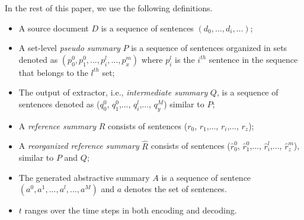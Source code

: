 In the rest of this paper, we use the following definitions.
\begin{itemize}
\item A source document $D$ is a sequence of sentences 
$(d_0, ...,d_i,...)$; 
\item A set-level \textit{pseudo summary} $P$ is
a sequence of sentences organized in sets 
denoted as $(p^0_0, p^0_1,...,p^l_i,...,p^m_x)$ 
where $p_i^l$ is the $i^{th}$ sentence in the sequence that
belongs to the $l^{th}$ set;
\item The output of extractor, i.e.,  \textit{intermediate summary}
$Q$, is a sequence of sentences denoted as 
($q^0_0$, $q^0_1$,..., $q^l_i$,..., $q^M_y$) similar to $P$;
\item A \textit{reference summary} $R$ consists of sentences 
($r_0$, $r_1$,..., $r_i$,..., $r_z$);
\item A \textit{reorganized reference summary} $\hat{R}$ consists of sentences 
($\hat{r}^0_0$, $\hat{r}^0_1$,..., $\hat{r}^l_i$,..., $\hat{r}^m_z$), 
similar to $P$ and $Q$; 
\item The generated abstractive summary $A$ is a sequence of sentence 
$(a^0,a^1,...,a^l,...,a^{M})$ and $a$ denotes the set of sentences.
\item $t$ ranges over the time steps in both encoding and decoding.
\end{itemize}


